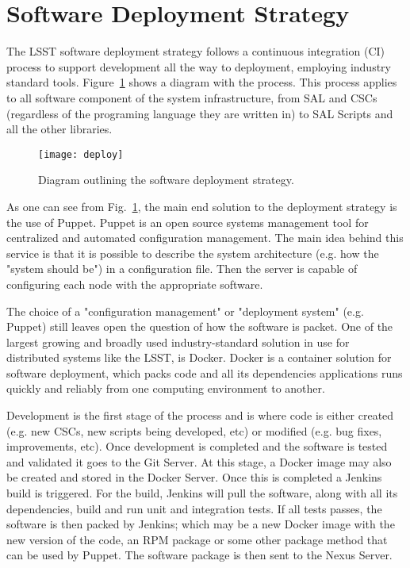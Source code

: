 \section{Software Deployment Strategy}\label{sect:deploy}
The LSST software deployment strategy follows a continuous integration (CI) process to support development all the way to deployment, employing industry standard tools. Figure~\ref{fig:deploy} shows a diagram with the process. This process applies to all software component of the system infrastructure, from SAL and CSCs (regardless of the programing language they are written in) to SAL Scripts and all the other libraries. 

\begin{figure}
\begin{center}
\texttt{[image: deploy]}
\caption{Diagram outlining the software deployment strategy.\label{fig:deploy}}
\end{center}
\end{figure}

As one can see from Fig.~\ref{fig:deploy}, the main end solution to the deployment strategy is the use of Puppet. Puppet is an open source systems management tool for centralized and automated configuration management. The main idea behind this service is that it is possible to describe the system architecture (e.g. how the "system should be") in a configuration file. Then the server is capable of configuring each node with the appropriate software. 

The choice of a "configuration management" or "deployment system" (e.g. Puppet) still leaves open the question of how the software is packet. One of the largest growing and broadly used industry-standard solution in use for distributed systems like the LSST, is Docker. Docker is a container solution for software deployment, which packs code and all its dependencies applications runs quickly and reliably from one computing environment to another. 

Development is the first stage of the process and is where code is either created (e.g. new CSCs, new scripts being developed, etc) or modified (e.g. bug fixes, improvements, etc). Once development is completed and the software is tested and validated it goes to the Git Server. At this stage, a Docker image may also be created and stored in the Docker Server. Once this is completed a Jenkins build is triggered. For the build, Jenkins will pull the software, along with all its dependencies, build and run unit and integration tests. If all tests passes, the software is then packed by Jenkins; which may be a new Docker image with the new version of the code, an RPM package or some other package method that can be used by Puppet. The software package is then sent to the Nexus Server. 

